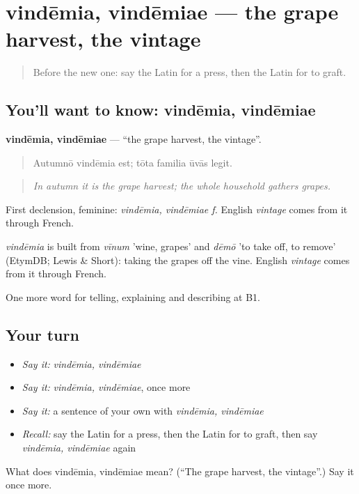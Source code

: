 \section[vindēmia, vindēmiae]{vindēmia, vindēmiae — the grape harvest, the vintage}

\label{lesson:LA-C479-vindemia}



\begin{quote}
Before the new one: say the Latin for a press, then the Latin for to graft.
\end{quote}

\subsection*{You'll want to know: vindēmia, vindēmiae}
\textbf{vindēmia, vindēmiae} — \textquotedblleft{}the grape harvest, the vintage\textquotedblright{}.

\begin{quote}
Autumnō vindēmia est; tōta familia ūvās legit.
\end{quote}

\begin{quote}
\emph{In autumn it is the grape harvest; the whole household gathers grapes.}
\end{quote}

First declension, feminine: \emph{vindēmia, vindēmiae f.} English \emph{vintage} comes from it through French.

\begin{cousinweb}
\emph{vindēmia} is built from \emph{vīnum} 'wine, grapes' and \emph{dēmō} 'to take off, to remove' (EtymDB; Lewis \& Short): taking the grapes off the vine. English \emph{vintage} comes from it through French.
\end{cousinweb}

\begin{grammarlens}[title={What you've built}]
One more word for telling, explaining and describing at B1.
\end{grammarlens}

\subsection*{Your turn}
\begin{itemize}
\raggedright
  \item \emph{Say it:} \emph{vindēmia, vindēmiae}
  \item \emph{Say it:} \emph{vindēmia, vindēmiae}, once more
  \item \emph{Say it:} a sentence of your own with \emph{vindēmia, vindēmiae}
  \item \emph{Recall:} say the Latin for a press, then the Latin for to graft, then say \emph{vindēmia, vindēmiae} again
\end{itemize}

\begin{tcolorbox}[breakable,colback=teal!4,colframe=teal!35!black,title={Before you move on}]
What does vindēmia, vindēmiae mean? (\textquotedblleft{}The grape harvest, the vintage\textquotedblright{}.) Say it once more.
\end{tcolorbox}
